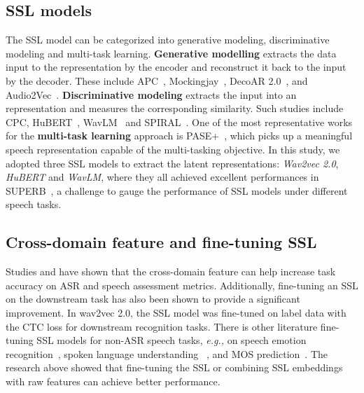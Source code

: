 \documentclass[a4paper]{article}
\begin{document}
\subsection{SSL models}
The SSL model can be categorized into generative modeling, discriminative modeling and multi-task learning. \textbf{Generative modelling} extracts the data input to the representation by the encoder and reconstruct it back to the input by the decoder. These include APC~\cite{chung2019unsupervised}, Mockingjay~\cite{liu2020mockingjay}, DecoAR 2.0~\cite{ling2020decoar}, and Audio2Vec~\cite{tagliasacchi2020pre}. 
\textbf{Discriminative modeling} extracts the input into an representation and measures the corresponding similarity. Such studies include CPC, HuBERT~\cite{hsu2021hubert}, WavLM~\cite{chen2021wavlm} and SPIRAL~\cite{huang2022spiral}. One of the most representative works for the \textbf{multi-task learning} approach is PASE+~\cite{ravanelli2020multi}, which picks up a meaningful speech representation capable of the multi-tasking objective.
In this study, we adopted three SSL models to extract the latent representations: \textit{Wav2vec 2.0}, \textit{HuBERT} and \textit{WavLM}, where they all achieved excellent performances in SUPERB~\cite{yang2021superb}, a challenge to gauge the performance of SSL models under different speech tasks. 







\subsection{Cross-domain feature and fine-tuning SSL}\label{subsec: fine-tuning SSL}

Studies \cite{chen2021wavlm} and \cite{zezario2021deep} have shown that the cross-domain feature can help increase task accuracy on ASR and speech assessment metrics.
Additionally, fine-tuning an SSL on the downstream task has also been shown to provide a significant improvement. In wav2vec 2.0, the SSL model was fine-tuned on label data with the CTC loss for downstream recognition tasks. There is other literature fine-tuning SSL models for non-ASR speech tasks, \textit{e.g.,} on speech emotion recognition~\cite{wang2021fine}, spoken language understanding ~\cite{nguyen2020investigating}, and MOS prediction~\cite{cooper2022generalization}.
The research above showed that fine-tuning the SSL or combining SSL embeddings with raw features can achieve better performance.
\end{document}
